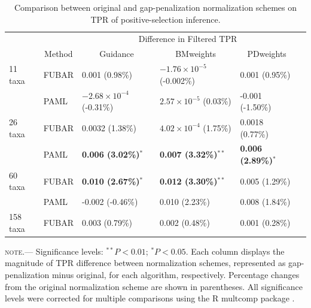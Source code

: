 \documentclass[11pt]{article}
\begin{document}
\begin{table}[H]
\caption {\label{tab:penalmodel} Comparison between original and gap-penalization normalization schemes on TPR of positive-selection inference.}
\begin{tabular}{l l l l l l}
\hline\noalign{\smallskip}
& & \multicolumn{3}{c}{Difference in Filtered TPR} \\
\cline{3-5}\noalign{\smallskip}
\multicolumn{1}{c}{Simulation Set} & \multicolumn{1}{c}{Method} & \multicolumn{1}{c}{Guidance} & \multicolumn{1}{c}{BMweights} & \multicolumn{1}{c}{PDweights} \\
\noalign{\smallskip}\hline\noalign{\smallskip}
11 taxa  & FUBAR & 0.001 (0.98\%) & $-1.76\times10^{-5}$ (-0.002\%) & 0.001 (0.95\%)\\
              & PAML & $-2.68\times10^{-4}$ (-0.31\%) & $2.57\times10^{-5}$ (0.03\%) & -0.001 (-1.50\%)\\
\hline
26 taxa   & FUBAR & 0.0032 (1.38\%) & $4.02\times10^{-4}$ (1.75\%) & 0.0018 (0.77\%)\\
              & PAML & \textbf{0.006 (3.02\%)}$^{\ast}$ & \textbf{0.007 (3.32\%)}$^{\ast\ast}$ & \textbf{0.006 (2.89\%)}$^{\ast}$ \\
\hline
60 taxa  & FUBAR & \textbf{0.010 (2.67\%)}$^{\ast}$ & \textbf{0.012 (3.30\%)}$^{\ast\ast}$  & 0.005  (1.29\%)\\
              & PAML & -0.002 (-0.46\%) & 0.010 (2.23\%) & 0.008 (1.84\%) \\
\hline
158 taxa & FUBAR & 0.003 (0.79\%) & 0.002 (0.48\%) & 0.001 (0.28\%)\\
\hline
\end{tabular}
\newline
\textsc{note.}--- Significance levels: $^{\ast\ast} P < 0.01$; $^{\ast} P < 0.05$. Each column displays the magnitude of TPR difference between normalization schemes, represented as gap-penalization minus original, for each algorithm, respectively. Percentage changes from the original normalization scheme are shown in parentheses. All significance levels were corrected for multiple comparisons using the R multcomp package \citep{Hothorn2008}.
\end{table}

\newpage
\end{document}
